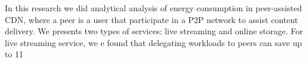 \documentclass{article}
\begin{document}
In this research we did analytical analysis of energy consumption in peer-assisted CDN, where a peer is a user that participate in a P2P network to assist content delivery.  
We presents two types of services: live streaming and online storage.  
For live streaming service, we e found that delegating workloads to peers can save up to 11%
\end{document}
